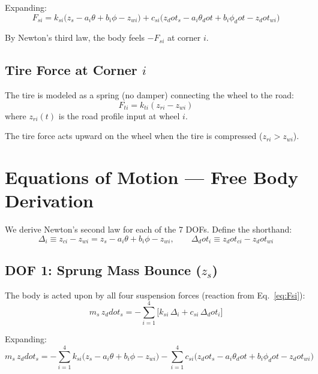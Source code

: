 \documentclass[11pt]{article}
\def\ddot#1{#1_ddot}%
\def\dot#1{#1_dot}%
\begin{document}
Expanding:
\begin{equation}
F_{si} = k_{si}\bigl(z_s - a_i\theta + b_i\phi - z_{wi}\bigr) + c_{si}\bigl(\dot{z}_s - a_i\dot{\theta} + b_i\dot{\phi} - \dot{z}_{wi}\bigr)
\label{eq:Fsi_expanded}
\end{equation}

By Newton's third law, the body feels $-F_{si}$ at corner $i$.

\subsection{Tire Force at Corner $i$}

The tire is modeled as a spring (no damper) connecting the wheel to the road:
\begin{equation}
\boxed{F_{ti} = k_{ti}(z_{ri} - z_{wi})}
\label{eq:Fti}
\end{equation}
where $z_{ri}(t)$ is the road profile input at wheel $i$.

The tire force acts upward on the wheel when the tire is compressed ($z_{ri} > z_{wi}$).

\section{Equations of Motion --- Free Body Derivation}

We derive Newton's second law for each of the 7 DOFs. Define the shorthand:
\begin{equation}
\Delta_i \equiv z_{ci} - z_{wi} = z_s - a_i\theta + b_i\phi - z_{wi}, \qquad
\dot{\Delta}_i \equiv \dot{z}_{ci} - \dot{z}_{wi}
\end{equation}

\subsection{DOF 1: Sprung Mass Bounce ($z_s$)}

The body is acted upon by all four suspension forces (reaction from Eq.~\eqref{eq:Fsi}):
\begin{equation}
\boxed{m_s\,\ddot{z}_s = -\sum_{i=1}^{4}\bigl[k_{si}\,\Delta_i + c_{si}\,\dot{\Delta}_i\bigr]}
\label{eq:eom_zs}
\end{equation}

Expanding:
\begin{equation}
m_s\,\ddot{z}_s = -\sum_{i=1}^{4} k_{si}\bigl(z_s - a_i\theta + b_i\phi - z_{wi}\bigr) - \sum_{i=1}^{4} c_{si}\bigl(\dot{z}_s - a_i\dot{\theta} + b_i\dot{\phi} - \dot{z}_{wi}\bigr)
\label{eq:eom_zs_exp}
\end{equation}
\end{document}
